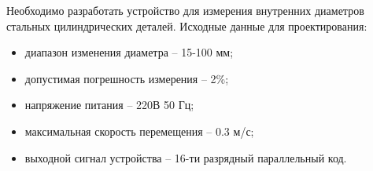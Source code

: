 Необходимо разработать устройство для измерения внутренних диаметров стальных цилиндрических деталей. Исходные данные для проектирования:
\begin{itemize}
    \item диапазон изменения диаметра -- 15-100 мм;
    \item допустимая погрешность измерения -- 2\%;
    \item напряжение питания -- 220В 50 Гц;
    \item максимальная скорость перемещения -- 0.3 м/с;
    \item выходной сигнал устройства -- 16-ти разрядный параллельный код.
\end{itemize}